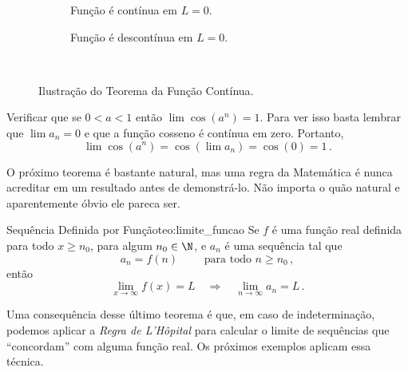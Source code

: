 \begin{figure}[h]
  \centering
  \begin{subfigure}[b]{0.5\linewidth}
    \centering
    
    \caption{Função é contínua em $L=0$.}
    \label{fig:teorema_funcao_continua_1}
  \end{subfigure}%
  \begin{subfigure}[b]{0.5\linewidth}
    \centering
    
    \caption{Função é descontínua em $L=0$.}
    \label{fig:teorema_funcao_continua_2}
  \end{subfigure}\\
  \caption{Ilustração do Teorema da Função Contínua.}
  \label{fig:teorema_funcao_continua}
\end{figure}

\begin{example}
  Verificar que se $0<a<1$ então $\lim\cos(a^n)=1.$
  \solution
  Para ver isso basta lembrar que $\lim a_n=0$
  e que a função cosseno é contínua em zero.
  Portanto,
  \[
    \lim\cos(a^n) = \cos\left(\lim a_n\right) = \cos(0) = 1 \,.
  \]
\end{example}

O próximo teorema é bastante natural, mas uma regra da Matemática é nunca
acreditar em um resultado antes de demonstrá-lo. Não importa o quão natural e
aparentemente óbvio ele pareca ser.

\begin{teorema}{Sequência Definida por Função}{teo:limite_funcao}
  Se $f$ é uma função real definida para todo $x\geq n_0$, para algum $n_0\in \N$,
  e $a_n$ é uma sequência tal que
  \[
    a_n = f(n) \qquad \text{ para todo } n \geq n_0    \,,
  \]
  então
  \[
    \lim_{x\to\infty}f(x)=L
    \quad \Rightarrow \quad
    \lim_{n\to \infty} a_n=L \,.
  \]
\end{teorema}

Uma consequência desse último teorema é que, em caso de indeterminação,
podemos aplicar a \emph{Regra de L'Hôpital} para
calcular o limite de sequências que ``concordam'' com alguma função real.
Os próximos exemplos aplicam essa técnica.

